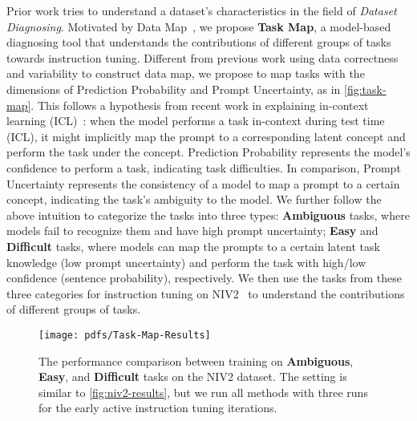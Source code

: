 Prior work tries to understand a dataset's characteristics in the field of \textit{Dataset Diagnosing}. 
Motivated by Data Map~\cite{swayamdipta-etal-2020-dataset}, we
propose \textbf{Task Map}, a model-based diagnosing tool that understands the contributions of different groups of tasks towards instruction tuning. Different from previous work using data correctness and variability to construct data map, we propose to map tasks with the dimensions of Prediction Probability and Prompt Uncertainty, as in \autoref{fig:task-map}. This follows a hypothesis from recent work in explaining in-context learning  (ICL)~\cite{xie2021explanation}:
when the model performs a task in-context during test time (ICL), it might implicitly map the prompt to a corresponding latent concept and perform the task under the concept.
Prediction Probability represents the model's confidence to perform a task, indicating task difficulties. In comparison, Prompt Uncertainty represents the consistency of a model to map a prompt to a certain concept, indicating the task's ambiguity to the model.
We further follow the above intuition to categorize the tasks into three types: \textbf{Ambiguous} tasks, where models fail to recognize them and have high prompt uncertainty; \textbf{Easy} and \textbf{Difficult} tasks, where models can map the prompts to a certain latent task knowledge (low prompt uncertainty) and perform the task with high/low confidence (sentence probability), respectively. We then use the tasks from these three categories for instruction tuning on NIV2~\cite{wang2022self} to understand the contributions of different groups of tasks.

\begin{figure}
    \centering
    \texttt{[image: pdfs/Task-Map-Results]}
    \vspace{-2em}
    \caption{\footnotesize
    The performance comparison between training on \textbf{Ambiguous}, \textbf{Easy}, and \textbf{Difficult} tasks on the NIV2 dataset. The setting is similar to \autoref{fig:niv2-results}, but we run all methods with three runs for the early active instruction tuning iterations.}
    \vspace{-1.5em}
    \label{fig:task-map-results}
\end{figure}

